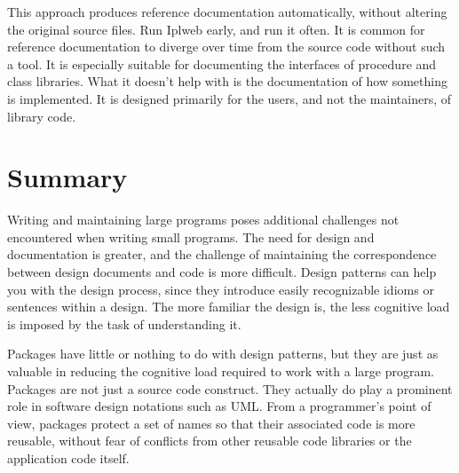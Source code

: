 This approach produces reference documentation automatically, without
altering the original source files. Run Iplweb early, and run it
often.  It is common for reference documentation to diverge over time
from the source code without such a tool. It is
especially suitable for documenting the interfaces of procedure and
class libraries. What it doesn't help with is the documentation of how
something is implemented. It is designed primarily for the users, and
not the maintainers, of library code.

\section{Summary}

Writing and maintaining large programs poses additional challenges not
encountered when writing small programs. The need for design and documentation
is greater, and the challenge of maintaining the correspondence between design
documents and code is more difficult.  Design patterns can help you with the
design process, since they introduce easily recognizable idioms or sentences
within a design. The more familiar the design is, the less cognitive load is
imposed by the task of understanding it.

Packages have little or nothing to do with design patterns, but they
are just as valuable in reducing the cognitive load required to work
with a large program. Packages are not just a source code
construct. They actually do play a prominent role in software design
notations such as UML. From a programmer's point of view, packages
protect a set of names so that their associated code is more reusable,
without fear of conflicts from other reusable code libraries or the
application code itself.
